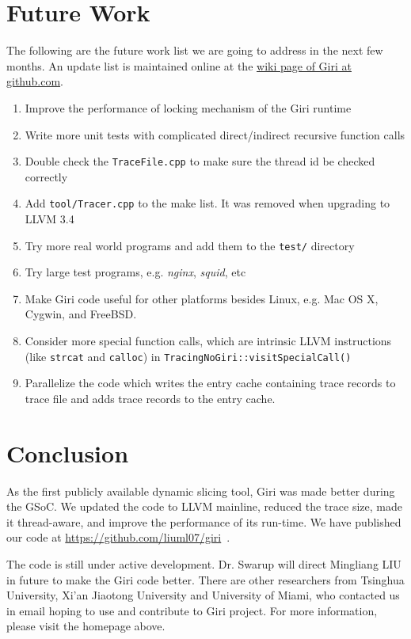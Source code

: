 \documentclass[DIV=calc, paper=a4, fontsize=11pt, twocolumn]{scrartcl}
\begin{document}
\section{Future Work}
The following are the future work list we are going to address in the next few months.
An update list is maintained online at the \href{https://github.com/liuml07/giri/wiki/TODO}{wiki page of Giri at github.com}.
\label{sec:todo}
\begin{enumerate}
	\item Improve the performance of locking mechanism of the Giri runtime
	\item Write more unit tests with complicated direct/indirect recursive function calls
	\item Double check the \texttt{TraceFile.cpp} to make sure the thread id be checked correctly
	\item Add \texttt{tool/Tracer.cpp} to the make list. It was removed when upgrading to LLVM 3.4
	\item Try more real world programs and add them to the \texttt{test/} directory
	\item Try large test programs, e.g. \emph{nginx}, \emph{squid}, etc
	\item Make Giri code useful for other platforms besides Linux, e.g. Mac OS X, Cygwin, and FreeBSD.
	\item Consider more special function calls, which are intrinsic LLVM instructions (like \texttt{strcat} and \texttt{calloc}) in \texttt{TracingNoGiri::visitSpecialCall()}
	\item Parallelize the code which writes the entry cache containing trace records to trace file and adds trace records to the entry cache.
\end{enumerate}

\section{Conclusion}
\label{sec:contact}
As the first publicly available dynamic slicing tool,
Giri was made better during the GSoC. We updated the code to LLVM mainline, reduced the trace size, made it thread-aware, and improve the performance of its run-time.
We have published our code at \href{https://github.com/liuml07/giri}{https://github.com/liuml07/giri}~\cite{giri}.

The code is still under active development.
Dr. Swarup will direct Mingliang LIU in future to make the Giri code better.
There are other researchers from Tsinghua University, Xi'an Jiaotong University and University of Miami,
who contacted us in email hoping to use and contribute to Giri project.
For more information, please visit the homepage above.


 
\end{document}
